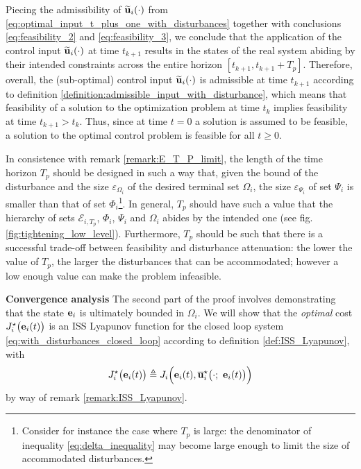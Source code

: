 

Piecing the admissibility of $\widetilde{\bm{\mathbf{u}}}_i(\cdot)$ from
\eqref{eq:optimal_input_t_plus_one_with_disturbances} together with conclusions
\eqref{eq:feasibility_2} and \eqref{eq:feasibility_3}, we conclude that the
application of the control input $\widetilde{\bm{\mathbf{u}}}_i(\cdot)$ at time
$t_{k+1}$ results in the states of the real system abiding by their intended
constraints across the entire horizon $[t_{k+1}, t_{k+1} + T_p]$. Therefore,
overall, the (sub-optimal) control input $\widetilde{\bm{\mathbf{u}}}_i(\cdot)$ is
admissible at time $t_{k+1}$ according to definition
\eqref{definition:admissible_input_with_disturbance}, which means
that feasibility of a solution to the optimization problem at time $t_k$ implies
feasibility at time $t_{k+1} > t_k$. Thus, since at time $t=0$ a solution is
assumed to be feasible, a solution to the optimal control problem is feasible
for all $t \geq 0$.\\[2.5ex]

\begin{bw_box}
  \begin{remark}
    In consistence with remark \eqref{remark:E_T_P_limit}, the length of the
    time horizon $T_p$ should be designed in such a way that, given the
    bound of the disturbance and the size $\varepsilon_{\Omega_i}$ of the
    desired terminal set $\Omega_i$, the size $\varepsilon_{\Psi_i}$ of set
    $\Psi_i$ is smaller than that of set $\Phi_i$\footnote{Consider for instance
    the case where $T_p$ is large: the denominator of inequality
    \eqref{eq:delta_inequality} may become large enough to limit the size of
    accommodated disturbances.}. In general, $T_p$ should have such a value that
    the hierarchy of sets $\mathcal{E}_{i,T_p}$, $\Phi_i$, $\Psi_i$ and
    $\Omega_i$ abides by the intended one
    (see fig.\eqref{fig:tightening_low_level}). Furthermore, $T_p$ should be
    such that there is a successful trade-off between feasibility and
    disturbance attenuation: the lower the value of $T_p$, the larger the
    disturbances that can be accommodated; however a low enough value can make
    the problem infeasible. \\[2.5ex]
  \end{remark}
\end{bw_box}

\textbf{Convergence analysis}
The second part of the proof involves demonstrating that the
state $\bm{\mathbf{e}}_i$ is ultimately bounded in $\Omega_i$. We will show that the
\textit{optimal} cost $J_i^{\star}\big(\bm{\mathbf{e}}_i(t)\big)$ is an
ISS Lyapunov function for the closed loop system
\eqref{eq:with_disturbances_closed_loop} according to definition
\eqref{def:ISS_Lyapunov}, with
$$J_i^{\star}\big(\vect{e}_i(t)\big) \triangleq J_i \Big(\vect{e}_i(t), \overline{\vect{u}}_i^{\star}\big(\cdot;\ \vect{e}_i(t)\big)\Big)$$
by way of remark \eqref{remark:ISS_Lyapunov}.

